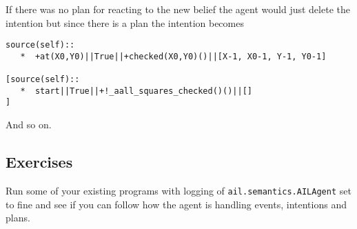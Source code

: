 \documentclass[a4]{article}
\begin{document}
If there was no plan for reacting to the new belief the agent would just delete the intention but since there is a plan the intention becomes
\begin{verbatim}
source(self):: 
   *  +at(X0,Y0)||True||+checked(X0,Y0)()||[X-1, X0-1, Y-1, Y0-1]

[source(self):: 
   *  start||True||+!_aall_squares_checked()()||[]
] 
\end{verbatim}
And so on.

\subsection{Exercises}
Run some of your existing programs with logging of \texttt{ail.semantics.AILAgent} set to fine and see if you can follow how the agent is handling events, intentions and plans.



\end{document}
